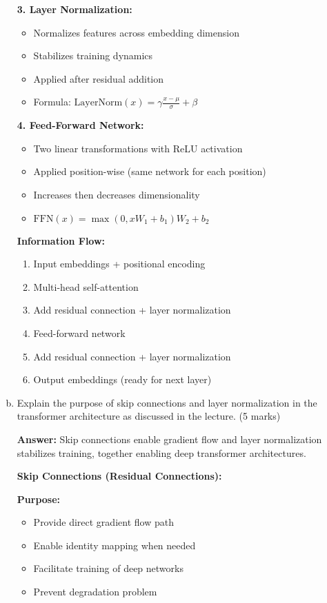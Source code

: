 \documentclass[12pt]{article}
\newcommand{\answer}[1]{{\color{answercolor}\textbf{Answer:} #1}}
\newcommand{\explanation}[1]{{\color{explanationcolor}#1}}
\begin{document}
\begin{enumerate}[(a)]
{    \textbf{3. Layer Normalization:}
    \begin{itemize}
        \item Normalizes features across embedding dimension
        \item Stabilizes training dynamics
        \item Applied after residual addition
        \item Formula: $\text{LayerNorm}(x) = \gamma \frac{x - \mu}{\sigma} + \beta$
    \end{itemize}
    
    \textbf{4. Feed-Forward Network:}
    \begin{itemize}
        \item Two linear transformations with ReLU activation
        \item Applied position-wise (same network for each position)
        \item Increases then decreases dimensionality
        \item $\text{FFN}(x) = \max(0, xW_1 + b_1)W_2 + b_2$
    \end{itemize}
    
    \textbf{Information Flow:}
    \begin{enumerate}
        \item Input embeddings + positional encoding
        \item Multi-head self-attention
        \item Add residual connection + layer normalization
        \item Feed-forward network
        \item Add residual connection + layer normalization
        \item Output embeddings (ready for next layer)
    \end{enumerate}
    }
    
    \item Explain the purpose of skip connections and layer normalization in the transformer architecture as discussed in the lecture. \hfill (5 marks)
    
    \answer{Skip connections enable gradient flow and layer normalization stabilizes training, together enabling deep transformer architectures.}
    
    \explanation{
    \textbf{Skip Connections (Residual Connections):}
    
    \textbf{Purpose:}
    \begin{itemize}
        \item Provide direct gradient flow path
        \item Enable identity mapping when needed
        \item Facilitate training of deep networks
        \item Prevent degradation problem
    \end{itemize}
    
}
\end{enumerate}
\end{document}
